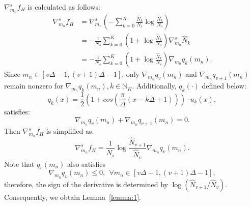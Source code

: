 \documentclass[10pt,journal,compsoc]{IEEEtran}
\begin{document}
\begin{IEEEproof}
  $\nabla^s_{m_n} f_H$ is calculated as follows:
\begin{equation}
\label{eqa:defdem}
    \begin{split}
        \nabla^s_{m_n} f_H &= \nabla^s_{m_n}\left(-\sum_{k=0}^K \frac{\hat{N}_k}{N_s}\log\frac{\hat{N}_k}{N_s}\right) \\
        &= -\frac{1}{N_s}\sum_{k=0}^K\left(1+\log\frac{\hat{N}_k}{N_s}\right)\nabla^s_{m_n}\hat{N}_k \\
        &= -\frac{1}{N_s}\sum_{k=0}^K\left(1+\log\frac{\hat{N}_k}{N_s}\right)\nabla_{m_n} q_k(m_n).
    \end{split}
\end{equation}
Since $m_n \in [v\Delta-1, (v+1)\Delta-1]$, only $\nabla_{m_n} q_v(m_n)$ and $\nabla_{m_n} q_{v+1}(m_n)$ remain nonzero for $\nabla_{m_n}q_k(m_n), k\in \mathbb{N}_K$. Additionally, $q_k(\cdot)$ defined below:
\begin{equation}
\label{eqa:qk}
q_k(x) = \frac{1}{2}(1+cos(\frac{\pi}{\Delta}(x-k\Delta+1)))\cdot u_k(x),
\end{equation}
satisfies:
\begin{equation}
    \nabla_{m_n} q_v(m_n) + \nabla_{m_n} q_{v+1}(m_n) = 0.
\end{equation}
Then $\nabla^s_{m_n} f_H$ is simplified as:
\begin{equation}
    \nabla^s_{m_n} f_H = \frac{1}{N_s} \log\frac{\hat{N}_{v+1}}{\hat{N}_{v}} \nabla_{m_n} q_v(m_n).
\end{equation}
Note that $q_v(m_n)$ also satisfies 
\begin{equation}
    \nabla_{m_n} q_v(m_n) \le 0, \ \ \forall m_n\in [v\Delta-1, (v+1)\Delta-1],
\end{equation}
therefore, the sign of the derivative is determined by $\log(\hat{N}_{v+1}/\hat{N}_{v})$. Consequently, we obtain Lemma~\ref{lemma:1}.
\end{IEEEproof}
\end{document}
